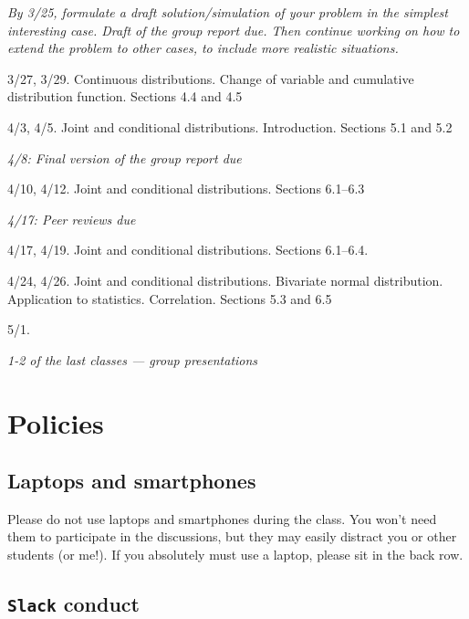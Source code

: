 \documentclass[oneside,11pt]{amsart}
\begin{document}
\begin{enumerate}[\bf{}{[}week 1{]}]
		\emph{By 3/25, formulate a draft solution/simulation of your problem in the
		simplest interesting case. 
		Draft of the group report due.
		Then continue working on how to extend the problem to other cases, 
		to include more realistic situations.}

	\item 3/27, 3/29. Continuous distributions. Change of variable and cumulative distribution function. Sections 4.4 and 4.5

	\item 4/3, 4/5. Joint and conditional distributions. Introduction. Sections 5.1 and 5.2
	
		\emph{4/8: Final version of the group report due}

	\item 4/10, 4/12. Joint and conditional distributions. 
		Sections 6.1--6.3

		\emph{4/17: Peer reviews due}
	
	\item 4/17, 4/19. Joint and conditional distributions. Sections 6.1--6.4.
		
	
	\item 4/24, 4/26. Joint and conditional distributions. Bivariate normal distribution. 
		Application to statistics. Correlation. Sections 5.3 and 6.5
	
	\item 5/1.

		\emph{1-2 of the last classes --- group presentations}

\end{enumerate}

\section{Policies}

\subsection{Laptops and smartphones}

Please do not use laptops and smartphones during the class.
You won't need them to participate in the discussions, but they may easily distract 
you or other students (or me!). If you absolutely must use a laptop, please sit in the back row.

\subsection{\texttt{Slack} conduct}
\end{document}
